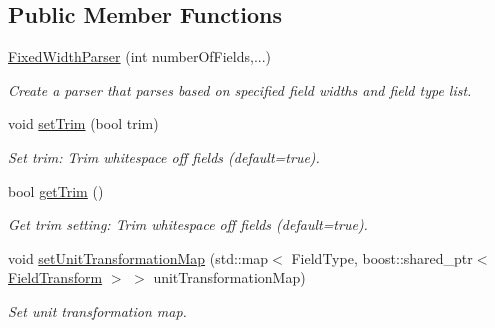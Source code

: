 \subsection*{Public Member Functions}
\begin{DoxyCompactItemize}
\item 
\hyperlink{classtudat_1_1input__output_1_1FixedWidthParser_a8fda5e8900c048b03262fcca6f7511b5}{Fixed\+Width\+Parser} (int number\+Of\+Fields,...)
\begin{DoxyCompactList}\small\item\em Create a parser that parses based on specified field widths and field type list. \end{DoxyCompactList}\item 
void \hyperlink{classtudat_1_1input__output_1_1FixedWidthParser_a5b524ddc5ccdd4c8c1e48910703e90dc}{set\+Trim} (bool trim)\hypertarget{classtudat_1_1input__output_1_1FixedWidthParser_a5b524ddc5ccdd4c8c1e48910703e90dc}{}\label{classtudat_1_1input__output_1_1FixedWidthParser_a5b524ddc5ccdd4c8c1e48910703e90dc}

\begin{DoxyCompactList}\small\item\em Set trim\+: Trim whitespace off fields (default=true). \end{DoxyCompactList}\item 
bool \hyperlink{classtudat_1_1input__output_1_1FixedWidthParser_a7c88bbf8652d6f183d5c33d70cd9ad3b}{get\+Trim} ()\hypertarget{classtudat_1_1input__output_1_1FixedWidthParser_a7c88bbf8652d6f183d5c33d70cd9ad3b}{}\label{classtudat_1_1input__output_1_1FixedWidthParser_a7c88bbf8652d6f183d5c33d70cd9ad3b}

\begin{DoxyCompactList}\small\item\em Get trim setting\+: Trim whitespace off fields (default=true). \end{DoxyCompactList}\item 
void \hyperlink{classtudat_1_1input__output_1_1FixedWidthParser_a999b4b9b23ace0c28c3402124318dfb0}{set\+Unit\+Transformation\+Map} (std\+::map$<$ Field\+Type, boost\+::shared\+\_\+ptr$<$ \hyperlink{classtudat_1_1input__output_1_1FieldTransform}{Field\+Transform} $>$ $>$ unit\+Transformation\+Map)\hypertarget{classtudat_1_1input__output_1_1FixedWidthParser_a999b4b9b23ace0c28c3402124318dfb0}{}\label{classtudat_1_1input__output_1_1FixedWidthParser_a999b4b9b23ace0c28c3402124318dfb0}

\begin{DoxyCompactList}\small\item\em Set unit transformation map. \end{DoxyCompactList}\end{DoxyCompactItemize}

